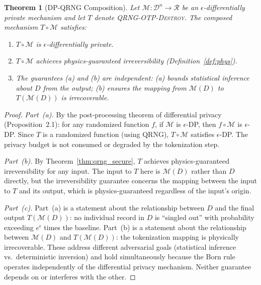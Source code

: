 \documentclass[journal]{IEEEtran}
\newtheorem{theorem}{Theorem}
\begin{document}
\begin{theorem}[DP-QRNG Composition]
\label{thm:dp-composition}
Let $\mathcal{M}\colon \mathcal{D}^n \to \mathcal{R}$ be an $\epsilon$-differentially private mechanism and let $T$ denote \textsc{QRNG-OTP-Destroy}. The composed mechanism $T \circ \mathcal{M}$ satisfies:
\begin{enumerate}
\item[(a)] $T \circ \mathcal{M}$ is $\epsilon$-differentially private.
\item[(b)] $T \circ \mathcal{M}$ achieves physics-guaranteed irreversibility (Definition~\ref{def:phys}).
\item[(c)] The guarantees (a) and (b) are independent: (a) bounds statistical inference about $D$ from the output; (b) ensures the mapping from $\mathcal{M}(D)$ to $T(\mathcal{M}(D))$ is irrecoverable.
\end{enumerate}
\end{theorem}

\begin{proof}
\emph{Part~(a).} By the post-processing theorem of differential privacy~\cite{dwork2014algfound} (Proposition~2.1): for any randomized function $f$, if $\mathcal{M}$ is $\epsilon$-DP, then $f \circ \mathcal{M}$ is $\epsilon$-DP. Since $T$ is a randomized function (using QRNG), $T \circ \mathcal{M}$ satisfies $\epsilon$-DP. The privacy budget is not consumed or degraded by the tokenization step.

\emph{Part~(b).} By Theorem~\ref{thm:qrng_secure}, $T$ achieves physics-guaranteed irreversibility for any input. The input to $T$ here is $\mathcal{M}(D)$ rather than $D$ directly, but the irreversibility guarantee concerns the mapping between the input to $T$ and its output, which is physics-guaranteed regardless of the input's origin.

\emph{Part~(c).} Part~(a) is a statement about the relationship between $D$ and the final output $T(\mathcal{M}(D))$: no individual record in $D$ is ``singled out'' with probability exceeding $e^\epsilon$ times the baseline. Part~(b) is a statement about the relationship between $\mathcal{M}(D)$ and $T(\mathcal{M}(D))$: the tokenization mapping is physically irrecoverable. These address different adversarial goals (statistical inference vs.\ deterministic inversion) and hold simultaneously because the Born rule operates independently of the differential privacy mechanism. Neither guarantee depends on or interferes with the other.
\end{proof}
\end{document}
